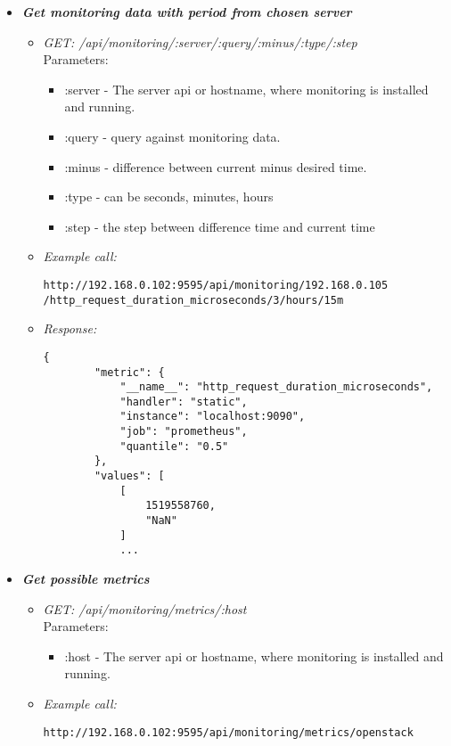 \begin{itemize}
\item \textbf{\textit{Get monitoring data with period from chosen server}}
\begin{itemize}
\item \emph{GET: /api/monitoring/:server/:query/:minus/:type/:step}
\\Parameters:
\begin{itemize}
\item :server - The server api or hostname, where monitoring is installed and running.
\item :query - query against monitoring data.
\item :minus - difference between current minus desired time.
\item :type - can be seconds, minutes, hours 
\item :step - the step between difference time and current time
\end{itemize}

\item \emph{Example call:}
 \begin{lstlisting}
http://192.168.0.102:9595/api/monitoring/192.168.0.105
/http_request_duration_microseconds/3/hours/15m
\end{lstlisting}

\item \emph{Response:}
 \begin{lstlisting}
{
        "metric": {
            "__name__": "http_request_duration_microseconds",
            "handler": "static",
            "instance": "localhost:9090",
            "job": "prometheus",
            "quantile": "0.5"
        },
        "values": [
            [
                1519558760,
                "NaN"
            ]
            ...
\end{lstlisting}
\end{itemize}


\item \textbf{\textit{Get possible metrics}}
\begin{itemize}
\item \emph{GET: /api/monitoring/metrics/:host}
\\Parameters:
\begin{itemize}
\item :host - The server api or hostname, where monitoring is installed and running.
\end{itemize}

\item \emph{Example call:}
 \begin{lstlisting}
http://192.168.0.102:9595/api/monitoring/metrics/openstack
\end{lstlisting}


\end{itemize}
\end{itemize}
